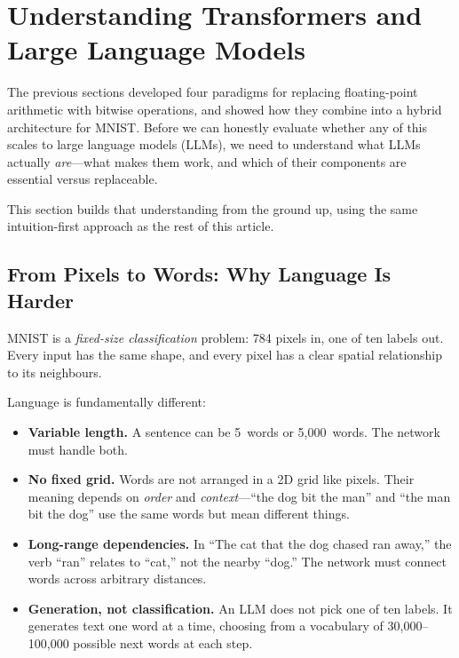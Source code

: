 \section{Understanding Transformers and Large Language Models}
\label{sec:transformers-llms}

The previous sections developed four paradigms for replacing
floating-point arithmetic with bitwise operations, and showed how they
combine into a hybrid architecture for MNIST. Before we can honestly
evaluate whether any of this scales to large language models (LLMs),
we need to understand what LLMs actually \emph{are}---what makes them
work, and which of their components are essential versus replaceable.

This section builds that understanding from the ground up, using the
same intuition-first approach as the rest of this article.

\subsection{From Pixels to Words: Why Language Is Harder}
\label{sec:pixels-vs-words}

MNIST is a \emph{fixed-size classification} problem: 784 pixels in,
one of ten labels out. Every input has the same shape, and every pixel
has a clear spatial relationship to its neighbours.

Language is fundamentally different:

\begin{itemize}[leftmargin=2em]
  \item \textbf{Variable length.} A sentence can be 5~words or
    5{,}000~words. The network must handle both.
  \item \textbf{No fixed grid.} Words are not arranged in a 2D grid
    like pixels. Their meaning depends on \emph{order} and
    \emph{context}---``the dog bit the man'' and ``the man bit the
    dog'' use the same words but mean different things.
  \item \textbf{Long-range dependencies.} In ``The cat that the dog
    chased ran away,'' the verb ``ran'' relates to ``cat,'' not the
    nearby ``dog.'' The network must connect words across arbitrary
    distances.
  \item \textbf{Generation, not classification.} An LLM does not pick
    one of ten labels. It generates text one word at a time, choosing
    from a vocabulary of 30{,}000--100{,}000 possible next words at
    each step.
\end{itemize}

